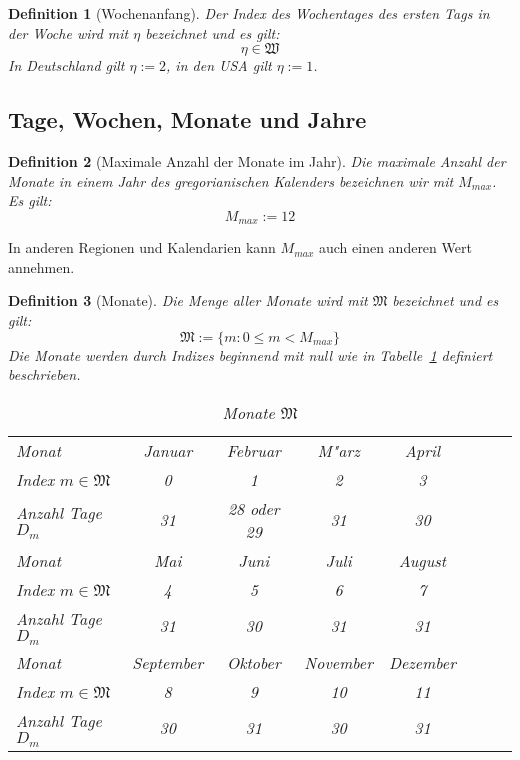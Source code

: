 \documentclass[a4paper]{article}
\newcommand*{\months}{\mathfrak{M}}
\newcommand*{\wkdays}{\mathfrak{W}}
\numberwithin{equation}{section}
\newtheorem{dfn}{Definition}
\begin{document}
\begin{dfn}[Wochenanfang]
  Der Index des Wochentages des ersten Tags in der Woche wird mit $\eta$
  bezeichnet und es gilt:
  \begin{equation}\eta \in \wkdays\end{equation}
  In Deutschland gilt $\eta := 2$, in den USA gilt $\eta := 1$.
\end{dfn}


%
%
\subsection{Tage, Wochen, Monate und Jahre}
\begin{dfn}[Maximale Anzahl der Monate im Jahr]
  Die maximale Anzahl der Monate in einem Jahr des gregorianischen Kalenders
  bezeichnen wir mit $M_{max}$. Es gilt:
  \begin{equation}M_{max} := 12\end{equation}
\end{dfn}
\noindent In anderen Regionen und Kalendarien kann $M_{max}$ auch einen anderen
Wert annehmen.
\begin{dfn}[Monate]
  Die Menge aller Monate wird mit $\months$ bezeichnet und es gilt:
  \begin{equation}\months := \{ m : 0 \le m < M_{max}\}\end{equation}
  Die Monate werden durch Indizes beginnend mit null wie in
  Tabelle~\ref{tab:months} definiert beschrieben.\footnotemark[\ref{ft:months}]
  \par
  \begin{table}[ht]
  \caption{Monate $\months$}\label{tab:months}
  \begin{tabularx}{\textwidth}{X|ccccccc}
    \hline
    Monat & Januar & Februar & M"arz & April \\
    Index $m \in \months$ & 0 & 1 & 2 & 3 \\
    Anzahl Tage $D_m$ & 31 & 28 oder 29 & 31 & 30 \\
    \hline
    Monat & Mai & Juni & Juli & August \\
    Index $m \in \months$ & 4 & 5 & 6 & 7 \\
    Anzahl Tage $D_m$ & 31 & 30 & 31 & 31 \\
    \hline
    Monat & September & Oktober & November & Dezember \\
    Index $m \in \months$ & 8 & 9 & 10 & 11 \\
    Anzahl Tage $D_m$ & 30 & 31 & 30 & 31 \\
    \hline
  \end{tabularx}\end{table}
\end{dfn}
\end{document}
